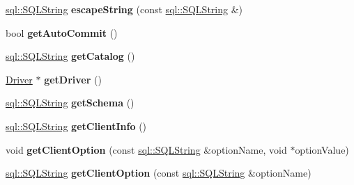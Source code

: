 \begin{DoxyCompactItemize}
\hypertarget{classsql_1_1mysql_1_1_my_s_q_l___connection_a4ab19794fc96f0b771dc7f3a9b89d445}{}\label{classsql_1_1mysql_1_1_my_s_q_l___connection_a4ab19794fc96f0b771dc7f3a9b89d445} 
\hyperlink{classsql_1_1_s_q_l_string}{sql\+::\+S\+Q\+L\+String} {\bfseries escape\+String} (const \hyperlink{classsql_1_1_s_q_l_string}{sql\+::\+S\+Q\+L\+String} \&)
\item 
\hypertarget{classsql_1_1mysql_1_1_my_s_q_l___connection_aa8a7c0dfd9b9dd7f8c00c43fefa2f8a4}{}\label{classsql_1_1mysql_1_1_my_s_q_l___connection_aa8a7c0dfd9b9dd7f8c00c43fefa2f8a4} 
bool {\bfseries get\+Auto\+Commit} ()
\item 
\hypertarget{classsql_1_1mysql_1_1_my_s_q_l___connection_af410a283060804936031001d38f89e9b}{}\label{classsql_1_1mysql_1_1_my_s_q_l___connection_af410a283060804936031001d38f89e9b} 
\hyperlink{classsql_1_1_s_q_l_string}{sql\+::\+S\+Q\+L\+String} {\bfseries get\+Catalog} ()
\item 
\hypertarget{classsql_1_1mysql_1_1_my_s_q_l___connection_af4aaa6f7a2564e6cd7b259a24fe8f0ef}{}\label{classsql_1_1mysql_1_1_my_s_q_l___connection_af4aaa6f7a2564e6cd7b259a24fe8f0ef} 
\hyperlink{classsql_1_1_driver}{Driver} $\ast$ {\bfseries get\+Driver} ()
\item 
\hypertarget{classsql_1_1mysql_1_1_my_s_q_l___connection_a49bf51d2c4586f8f85c362a6c71cf8b6}{}\label{classsql_1_1mysql_1_1_my_s_q_l___connection_a49bf51d2c4586f8f85c362a6c71cf8b6} 
\hyperlink{classsql_1_1_s_q_l_string}{sql\+::\+S\+Q\+L\+String} {\bfseries get\+Schema} ()
\item 
\hypertarget{classsql_1_1mysql_1_1_my_s_q_l___connection_aa94814c22d27fae1f62f8a077619026c}{}\label{classsql_1_1mysql_1_1_my_s_q_l___connection_aa94814c22d27fae1f62f8a077619026c} 
\hyperlink{classsql_1_1_s_q_l_string}{sql\+::\+S\+Q\+L\+String} {\bfseries get\+Client\+Info} ()
\item 
\hypertarget{classsql_1_1mysql_1_1_my_s_q_l___connection_a0c80ccabb9723fc4e7bcbe1fac2b7cbf}{}\label{classsql_1_1mysql_1_1_my_s_q_l___connection_a0c80ccabb9723fc4e7bcbe1fac2b7cbf} 
void {\bfseries get\+Client\+Option} (const \hyperlink{classsql_1_1_s_q_l_string}{sql\+::\+S\+Q\+L\+String} \&option\+Name, void $\ast$option\+Value)
\item 
\hypertarget{classsql_1_1mysql_1_1_my_s_q_l___connection_a6aa6995181dd5acfa0c18ec7917d2d02}{}\label{classsql_1_1mysql_1_1_my_s_q_l___connection_a6aa6995181dd5acfa0c18ec7917d2d02} 
\hyperlink{classsql_1_1_s_q_l_string}{sql\+::\+S\+Q\+L\+String} {\bfseries get\+Client\+Option} (const \hyperlink{classsql_1_1_s_q_l_string}{sql\+::\+S\+Q\+L\+String} \&option\+Name)

\end{DoxyCompactItemize}
